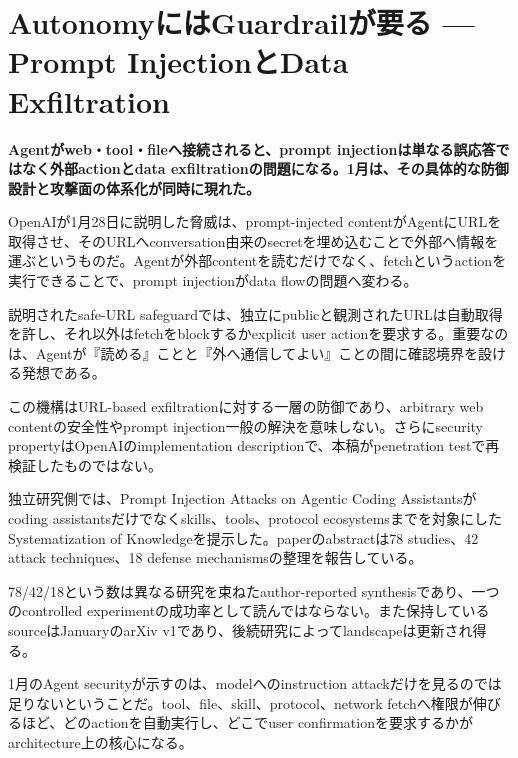 \section{AutonomyにはGuardrailが要る — Prompt InjectionとData Exfiltration}
\label{pkg:autonomy-needs-guardrails}
\noindent\textbf{Agentがweb・tool・fileへ接続されると、prompt injectionは単なる誤応答ではなく外部actionとdata exfiltrationの問題になる。1月は、その具体的な防御設計と攻撃面の体系化が同時に現れた。}\autocite{src-0d2abbb0fa62,src-e9010a7fe30b}

OpenAIが1月28日に説明した脅威は、prompt-injected contentがAgentにURLを取得させ、そのURLへconversation由来のsecretを埋め込むことで外部へ情報を運ぶというものだ。Agentが外部contentを読むだけでなく、fetchというactionを実行できることで、prompt injectionがdata flowの問題へ変わる。\autocite{src-0d2abbb0fa62}


説明されたsafe-URL safeguardでは、独立にpublicと観測されたURLは自動取得を許し、それ以外はfetchをblockするかexplicit user actionを要求する。重要なのは、Agentが『読める』ことと『外へ通信してよい』ことの間に確認境界を設ける発想である。\autocite{src-0d2abbb0fa62}


\begin{claimboundary}
この機構はURL-based exfiltrationに対する一層の防御であり、arbitrary web contentの安全性やprompt injection一般の解決を意味しない。さらにsecurity propertyはOpenAIのimplementation descriptionで、本稿がpenetration testで再検証したものではない。\autocite{src-0d2abbb0fa62}
\end{claimboundary}

独立研究側では、Prompt Injection Attacks on Agentic Coding Assistantsがcoding assistantsだけでなくskills、tools、protocol ecosystemsまでを対象にしたSystematization of Knowledgeを提示した。paperのabstractは78 studies、42 attack techniques、18 defense mechanismsの整理を報告している。\autocite{src-e9010a7fe30b}


\begin{claimboundary}
78/42/18という数は異なる研究を束ねたauthor-reported synthesisであり、一つのcontrolled experimentの成功率として読んではならない。また保持しているsourceはJanuaryのarXiv v1であり、後続研究によってlandscapeは更新され得る。\autocite{src-e9010a7fe30b}
\end{claimboundary}

1月のAgent securityが示すのは、modelへのinstruction attackだけを見るのでは足りないということだ。tool、file、skill、protocol、network fetchへ権限が伸びるほど、どのactionを自動実行し、どこでuser confirmationを要求するかがarchitecture上の核心になる。\autocite{src-0d2abbb0fa62,src-e9010a7fe30b}
